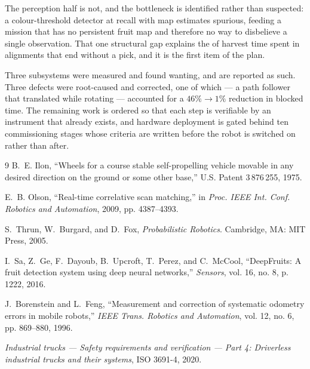 \documentclass[conference]{IEEEtran}
\begin{document}
The perception half is not, and the bottleneck is identified rather than
suspected: a colour-threshold detector at  recall with
 map estimates spurious, feeding a mission that has no
persistent fruit map and therefore no way to disbelieve a single observation.
That one structural gap explains the  of harvest time spent in
alignments that end without a pick, and it is the first item of the plan.

Three subsystems were measured and found wanting, and are reported as such.
Three defects were root-caused and corrected, one of which --- a path follower
that translated while rotating --- accounted for a $46\% \rightarrow 1\%$
reduction in blocked time. The remaining work is ordered so that each step is
verifiable by an instrument that already exists, and hardware deployment is
gated behind ten commissioning stages whose criteria are written before the
robot is switched on rather than after.

\begin{thebibliography}{9}
B.~E. Ilon, ``Wheels for a course stable self-propelling vehicle movable in
any desired direction on the ground or some other base,'' U.S. Patent
3\,876\,255, 1975.

E.~B. Olson, ``Real-time correlative scan matching,'' in \emph{Proc. IEEE Int.
Conf. Robotics and Automation}, 2009, pp. 4387--4393.

S.~Thrun, W.~Burgard, and D.~Fox, \emph{Probabilistic Robotics}. Cambridge,
MA: MIT Press, 2005.

I.~Sa, Z.~Ge, F.~Dayoub, B.~Upcroft, T.~Perez, and C.~McCool, ``DeepFruits: A
fruit detection system using deep neural networks,'' \emph{Sensors}, vol. 16,
no. 8, p. 1222, 2016.

J.~Borenstein and L.~Feng, ``Measurement and correction of systematic odometry
errors in mobile robots,'' \emph{IEEE Trans. Robotics and Automation},
vol. 12, no. 6, pp. 869--880, 1996.

\emph{Industrial trucks --- Safety requirements and verification --- Part 4:
Driverless industrial trucks and their systems}, ISO 3691-4, 2020.
\end{thebibliography}
\end{document}
